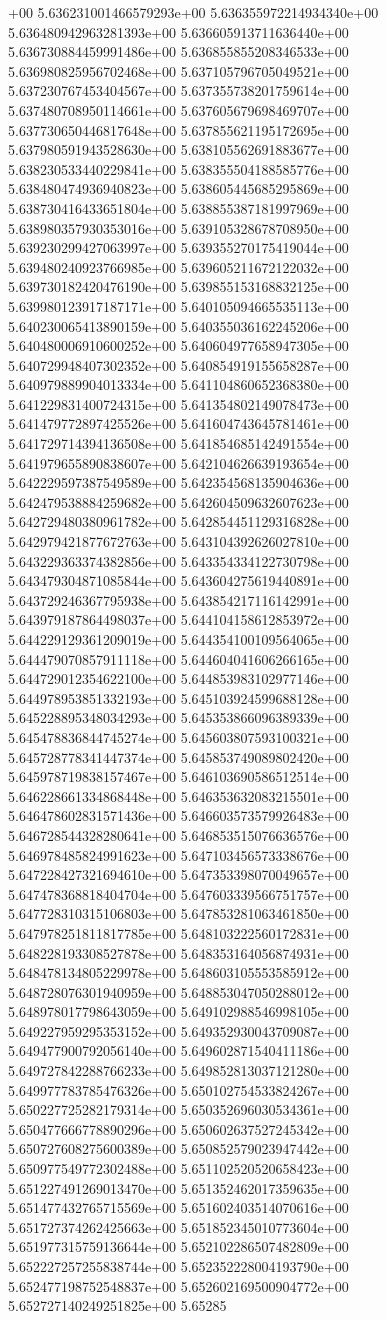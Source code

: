 +00	5.636231001466579293e+00	5.636355972214934340e+00	5.636480942963281393e+00	5.636605913711636440e+00	5.636730884459991486e+00	5.636855855208346533e+00	5.636980825956702468e+00	5.637105796705049521e+00	5.637230767453404567e+00	5.637355738201759614e+00	5.637480708950114661e+00	5.637605679698469707e+00	5.637730650446817648e+00	5.637855621195172695e+00	5.637980591943528630e+00	5.638105562691883677e+00	5.638230533440229841e+00	5.638355504188585776e+00	5.638480474936940823e+00	5.638605445685295869e+00	5.638730416433651804e+00	5.638855387181997969e+00	5.638980357930353016e+00	5.639105328678708950e+00	5.639230299427063997e+00	5.639355270175419044e+00	5.639480240923766985e+00	5.639605211672122032e+00	5.639730182420476190e+00	5.639855153168832125e+00	5.639980123917187171e+00	5.640105094665535113e+00	5.640230065413890159e+00	5.640355036162245206e+00	5.640480006910600252e+00	5.640604977658947305e+00	5.640729948407302352e+00	5.640854919155658287e+00	5.640979889904013334e+00	5.641104860652368380e+00	5.641229831400724315e+00	5.641354802149078473e+00	5.641479772897425526e+00	5.641604743645781461e+00	5.641729714394136508e+00	5.641854685142491554e+00	5.641979655890838607e+00	5.642104626639193654e+00	5.642229597387549589e+00	5.642354568135904636e+00	5.642479538884259682e+00	5.642604509632607623e+00	5.642729480380961782e+00	5.642854451129316828e+00	5.642979421877672763e+00	5.643104392626027810e+00	5.643229363374382856e+00	5.643354334122730798e+00	5.643479304871085844e+00	5.643604275619440891e+00	5.643729246367795938e+00	5.643854217116142991e+00	5.643979187864498037e+00	5.644104158612853972e+00	5.644229129361209019e+00	5.644354100109564065e+00	5.644479070857911118e+00	5.644604041606266165e+00	5.644729012354622100e+00	5.644853983102977146e+00	5.644978953851332193e+00	5.645103924599688128e+00	5.645228895348034293e+00	5.645353866096389339e+00	5.645478836844745274e+00	5.645603807593100321e+00	5.645728778341447374e+00	5.645853749089802420e+00	5.645978719838157467e+00	5.646103690586512514e+00	5.646228661334868448e+00	5.646353632083215501e+00	5.646478602831571436e+00	5.646603573579926483e+00	5.646728544328280641e+00	5.646853515076636576e+00	5.646978485824991623e+00	5.647103456573338676e+00	5.647228427321694610e+00	5.647353398070049657e+00	5.647478368818404704e+00	5.647603339566751757e+00	5.647728310315106803e+00	5.647853281063461850e+00	5.647978251811817785e+00	5.648103222560172831e+00	5.648228193308527878e+00	5.648353164056874931e+00	5.648478134805229978e+00	5.648603105553585912e+00	5.648728076301940959e+00	5.648853047050288012e+00	5.648978017798643059e+00	5.649102988546998105e+00	5.649227959295353152e+00	5.649352930043709087e+00	5.649477900792056140e+00	5.649602871540411186e+00	5.649727842288766233e+00	5.649852813037121280e+00	5.649977783785476326e+00	5.650102754533824267e+00	5.650227725282179314e+00	5.650352696030534361e+00	5.650477666778890296e+00	5.650602637527245342e+00	5.650727608275600389e+00	5.650852579023947442e+00	5.650977549772302488e+00	5.651102520520658423e+00	5.651227491269013470e+00	5.651352462017359635e+00	5.651477432765715569e+00	5.651602403514070616e+00	5.651727374262425663e+00	5.651852345010773604e+00	5.651977315759136644e+00	5.652102286507482809e+00	5.652227257255838744e+00	5.652352228004193790e+00	5.652477198752548837e+00	5.652602169500904772e+00	5.652727140249251825e+00	5.65285